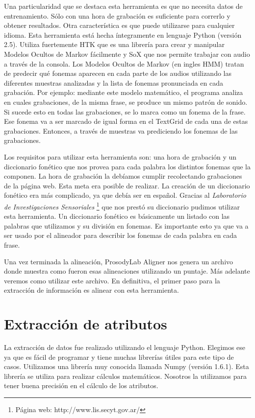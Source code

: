 Una particularidad que se destaca esta herramienta es que no necesita datos de entrenamiento. Sólo con una hora de grabación es suficiente para correrlo y obtener resultados. Otra característica es que puede utilizarse para cualquier idioma. Esta herramienta está hecha íntegramente en lenguaje Python (versión 2.5). Utiliza fuertemente HTK que es una librería para crear y manipular Modelos Ocultos de Markov fácilmente y SoX que nos permite trabajar con audio a través de la consola. Los Modelos Ocultos de Markov \cite{rabiner} (en ingles HMM) tratan de predecir qué fonemas aparecen en cada parte de los audios utilizando las diferentes muestras analizadas y la lista de fonemas pronunciada en cada grabación. Por ejemplo: mediante este modelo matemático, el programa analiza en cuales grabaciones, de la misma frase, se produce un mismo patrón de sonido. Si sucede esto en todas las grabaciones, se lo marca como un fonema de la frase. Ese fonema va a ser marcado de igual forma en el TextGrid de cada una de estas grabaciones. Entonces, a través de muestras va prediciendo los fonemas de las grabaciones.

Los requisitos para utilizar esta herramienta son: una hora de grabación y un diccionario fonético que nos provea para cada palabra los distintos fonemas que la componen. La hora de grabación la debíamos cumplir recolectando grabaciones de la página web. Esta meta era posible de realizar. La creación de un diccionario fonético era más complicado, ya que debía ser en español. Gracias al \textit{Laboratorio de Investigaciones Sensoriales} \footnote{Página web: http://www.lis.secyt.gov.ar/} que nos prestó su diccionario pudimos utilizar esta herramienta. Un diccionario fonético es básicamente un listado con las palabras que utilizamos y su división en fonemas. Es importante esto ya que va a ser usado por el alineador para describir los fonemas de cada palabra en cada frase.

Una vez terminada la alineación, ProsodyLab Aligner nos genera un archivo donde muestra como fueron esas alineaciones utilizando un puntaje. Más adelante veremos como utilizar este archivo. En definitiva, el primer paso para la extracción de información es alinear con esta herramienta. 

\section{Extracción de atributos}

La extracción de datos fue realizado utilizando el lenguaje Python. Elegimos ese ya que es fácil de programar y tiene muchas librerías útiles para este tipo de casos. Utilizamos una librería muy conocida llamada Numpy (versión 1.6.1). Esta librería se utiliza para realizar cálculos matemáticos. Nosotros la utilizamos para tener buena precisión en el cálculo de los atributos.

